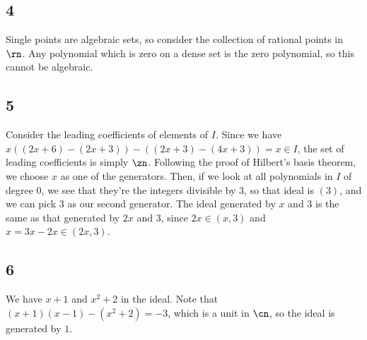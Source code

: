 \documentclass{article}
\begin{document}
\subsection*{4}
Single points are algebraic sets, so consider the collection of rational points in $\rn$. Any polynomial which is zero on a dense set is the zero polynomial, so this cannot be algebraic.
\subsection*{5}
Consider the leading coefficients of elements of $I$. Since we have $x((2x+6)-(2x+3))-((2x+3)-(4x+3))=x\in I$, the set of leading coefficients is simply $\zn$. Following the proof of Hilbert's basis theorem, we choose $x$ as one of the generators. Then, if we look at all polynomials in $I$ of degree $0$, we see that they're the integers divisible by $3$, so that ideal is $(3)$, and we can pick $3$ as our second generator. The ideal generated by $x$ and $3$ is the same as that generated by $2x$ and $3$, since $2x\in(x,3)$ and $x=3x-2x\in(2x,3)$.
\subsection*{6}
We have $x+1$ and $x^2+2$ in the ideal. Note that $(x+1)(x-1)-(x^2+2)=-3$, which is a unit in $\cn$, so the ideal is generated by $1$.
\end{document}
